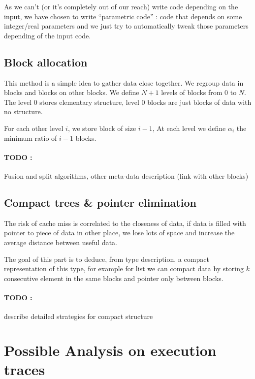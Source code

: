 \documentclass[12pt]{article}
\begin{document}
As we can't (or it's completely out of our reach) write code
depending on the input, we have chosen to write ``parametric code'' : code that
depends on some integer/real parameters and we just try to automatically tweak
those parameters depending of the input code.

\subsection{Block allocation}

This method is a simple idea to gather data close together. We regroup data in
blocks and blocks on other blocks. We define $N +1$ levels of blocks from 0 to
$N$. The level $0$ stores elementary structure, level $0$ blocks are just blocks of
data with no structure.

For each other level $i$, we store block of size $i-1$, At each level we define
$\alpha_i$ the minimum ratio of $i-1$ blocks.


\paragraph{TODO :} Fusion and split algorithms, other meta-data description (link
with other blocks)




\subsection{Compact trees \& pointer elimination}

The risk of cache miss is correlated to the closeness of data, if data is filled
with pointer to piece of data in other place, we lose lots of space and increase
the average distance between useful data.

The goal of this part is to deduce, from type description, a compact
representation of this type, for example for list we can compact data by storing
$k$ consecutive element in the same blocks and pointer only between blocks.


\paragraph{TODO :} describe detailed strategies for compact structure





\section{Possible Analysis on execution traces}
\label{logs}
\end{document}
